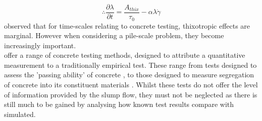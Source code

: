 \begin{equation}
\therefore
\frac{\partial \lambda}{\partial t}=\frac{A_{thix}}{\tau_0}-\alpha\lambda\dot{\gamma}
\label{eq:thixdt}
\end{equation}
\noindent
\citet{roussel07} observed that for time-scales relating to concrete testing, thixotropic effects are marginal. However when considering a pile-scale problem, they become increasingly important.\\
\newline
\noindent
\citet{Sperwall} offer a range of concrete testing methods, designed to attribute a quantitative measurement to a traditionally empirical test. These range from tests designed to assess the 'passing ability' of concrete \citeauthor{BS1235010}, to those designed to measure segregation of concrete into its constituent materials \citeauthor{ASTMbleed}. Whilst these tests do not offer the level of information provided by the slump flow, they must not be neglected as there is still much to be gained by analysing how known test results compare with simulated.

